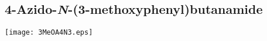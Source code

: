 %
%
%
%
%
%

\subsection{4\hyp{}Azido\hyp{}\textit{N}\hyp{}(3\hyp{}methoxyphenyl)butanamide }


\begin{scheme}[H]
	\begin{center}
		\texttt{[image: 3MeOA4N3.eps]}
	\end{center}
\end{scheme}

